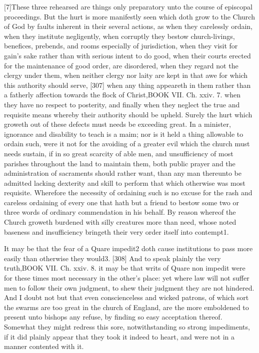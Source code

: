 [7]These three rehearsed are things only preparatory unto the course of episcopal proceedings. But the hurt is more manifestly seen which doth grow to the Church of God by faults inherent in their several actions, as when they carelessly ordain, when they institute negligently, when corruptly they bestow church-livings, benefices, prebends, and rooms especially of jurisdiction, when they visit for gain’s sake rather than with serious intent to do good, when their courts erected for the maintenance of good order, are disordered, when they regard not the clergy under them, when neither clergy nor laity are kept in that awe for which this authority should serve, [307] when any thing appeareth in them rather than a fatherly affection towards the flock of Christ,BOOK VII. Ch. xxiv. 7. when they have no respect to posterity, and finally when they neglect the true and requisite means whereby their authority should be upheld. Surely the hurt which groweth out of these defects must needs be exceeding great. In a minister, ignorance and disability to teach is a maim; nor is it held a thing allowable to ordain such, were it not for the avoiding of a greater evil which the church must needs sustain, if in so great scarcity of able men, and unsufficiency of most parishes throughout the land to maintain them, both public prayer and the administration of sacraments should rather want, than any man thereunto be admitted lacking dexterity and skill to perform that which otherwise was most requisite. Wherefore the necessity of ordaining such is no excuse for the rash and careless ordaining of every one that hath but a friend to bestow some two or three words of ordinary commendation in his behalf. By reason whereof the Church groweth burdened with silly creatures more than need, whose noted baseness and insufficiency bringeth their very order itself into contempt1.

It may be that the fear of a Quare impedit2 doth cause institutions to pass more easily than otherwise they would3. [308] And to speak plainly the very truth,BOOK VII. Ch. xxiv. 8. it may be that writs of Quare non impedit were for these times most necessary in the other’s place: yet where law will not suffer men to follow their own judgment, to shew their judgment they are not hindered. And I doubt not but that even conscienceless and wicked patrons, of which sort the swarms are too great in the church of England, are the more emboldened to present unto bishops any refuse, by finding so easy acceptation thereof. Somewhat they might redress this sore, notwithstanding so strong impediments, if it did plainly appear that they took it indeed to heart, and were not in a manner contented with it.

